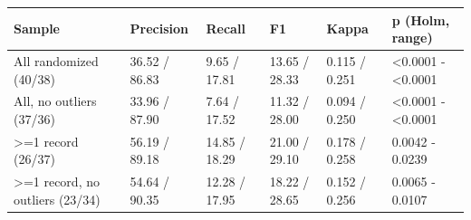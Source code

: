 \begin{tabular}{llllll}
\toprule
Sample & Precision & Recall & F1 & Kappa & p (Holm, range) \\
\midrule
All randomized (40/38) & 36.52 / 86.83 & 9.65 / 17.81 & 13.65 / 28.33 & 0.115 / 0.251 & <0.0001 - <0.0001 \\
All, no outliers (37/36) & 33.96 / 87.90 & 7.64 / 17.52 & 11.32 / 28.00 & 0.094 / 0.250 & <0.0001 - <0.0001 \\
>=1 record (26/37) & 56.19 / 89.18 & 14.85 / 18.29 & 21.00 / 29.10 & 0.178 / 0.258 & 0.0042 - 0.0239 \\
>=1 record, no outliers (23/34) & 54.64 / 90.35 & 12.28 / 17.95 & 18.22 / 28.65 & 0.152 / 0.256 & 0.0065 - 0.0107 \\
\bottomrule
\end{tabular}
